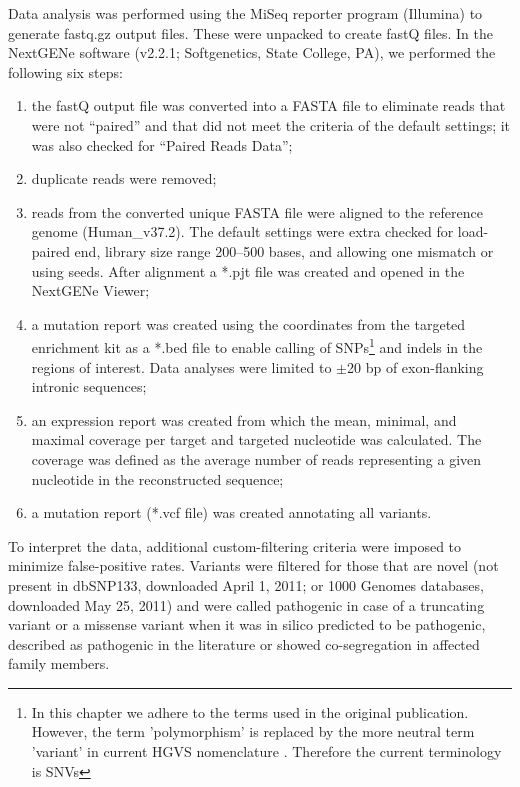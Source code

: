Data analysis was performed using the MiSeq reporter program (Illumina) to generate fastq.gz output files. 
These were unpacked to create fastQ files. 
In the NextGENe software (v2.2.1; Softgenetics, State College, PA), we performed the following six steps:
\begin{enumerate}
\item the fastQ output file was converted into a FASTA file to eliminate reads that were not “paired” and that did not meet the criteria of the default settings; it was also checked for “Paired Reads Data”;
\item duplicate reads were removed; 
\item reads from the converted unique FASTA file were aligned to the reference genome (Human\_v37.2). The default settings were extra checked for load-paired end, library size range 200–500 bases, and allowing one mismatch or using seeds. After alignment a *.pjt file was created and opened in the NextGENe Viewer;
\item a mutation report was created using the coordinates from the targeted enrichment kit as a *.bed file to enable calling of SNPs\footnote{In this chapter we adhere to the terms used in the original publication. However, the term 'polymorphism' is replaced by the more neutral term 'variant' in current HGVS nomenclature \cite{den_Dunnen_2016}. Therefore the current terminology is SNVs} and indels in the regions of interest. 
Data analyses were limited to $\pm$20 bp of exon-flanking intronic sequences;
\item an expression report was created from which the mean, minimal, and maximal coverage per target and targeted nucleotide was calculated. The coverage was defined as the average number of reads representing a given nucleotide in the reconstructed sequence;
\item a mutation report (*.vcf file) was created annotating all variants.
\end{enumerate}

\noindent To interpret the data, additional custom-filtering criteria were imposed to minimize false-positive rates. 
Variants were filtered for those that are novel (not present in dbSNP133, downloaded April 1, 2011; or 1000 Genomes databases, downloaded May 25, 2011) and were called pathogenic in case of a truncating variant or a missense variant when it was in silico predicted to be pathogenic, described as pathogenic in the literature or showed co-segregation in affected family members.

